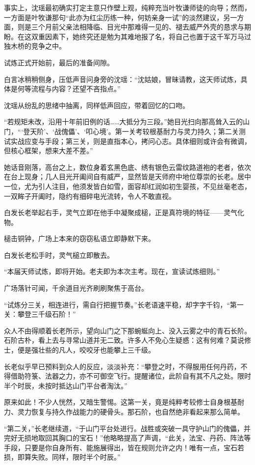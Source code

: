 事实上，沈瑶最初确实打定主意只作壁上观，纯粹充当叶牧谦师徒的向导；然而，一方面是叶牧谦那句“此亦为红尘历练一种，何妨亲身一试”的淡然建议，另一方面，则是三个月前父亲法相降临、目光中那难得一见的、褪去威严外壳的恳求与期盼。在这双重因素下，她终究还是勉为其难地报了名，将自己也置于这千军万马过独木桥的竞争之中。

\vspace{2em}

试炼正式开始前，最后的准备间隙。

白言冰稍稍侧身，压低声音问身旁的沈瑶：“沈姑娘，冒昧请教，这天师试炼，具体是何等流程与内容？还望不吝指点。”

沈瑶从纷乱的思绪中抽离，同样低声回应，带着回忆的口吻。

“若规矩未改，沿用十年前旧例的话……大抵分为三段。”她目光扫向那高耸入云的山门，“‘登天阶’、‘战傀儡’、‘叩心境’。第一关考较根基耐力与灵力持久；第二关测试实战应变与手段；第三关，则是直指本心，拷问心志。具体细则或许会有微调，但核心框架，想来大差不差。”

她话音刚落，高台之上，数位身着玄黑色底、绣有银色云雷纹路道袍的老者，依次在台上现身；几人目光开阖间自有威严，显然皆是天师府中地位尊崇的长老。居中一位，尤为引人注目，他须发皆白如雪，面容却红润如初生婴孩，不见丝毫老态，一双眸子开阖时，隐约有细碎电光流转，令人不敢直视。

白发长老举起右手，灵气立即在他手中凝聚成槌，正是真符境的特征——灵气化物。

槌击铜钟，广场上本来的窃窃私语立即静默下来。

白发长老松手时，灵气槌立即散去。

“本届天师试炼，即将开始。老夫即为本次主考。现在，宣读试炼细则。”

广场落针可闻，千余道目光齐刷刷聚焦于高台。

“试炼分三关，相连进行，需自行把握节奏。”长老语速平稳，却字字千钧，“第一关：攀登三千级石阶！”

众人不由得顺着长老所示，望向山门之下那蜿蜒向上、没入云雾之中的青石长阶。石阶古朴，看上去与寻常山道并无二致。许多人不免心生疑惑：这有何难？莫说修士，便是强壮些的凡人，咬咬牙也能攀上三千级。

长老似乎早已预料到众人的反应，淡淡补充：“攀登之时，不得服用任何丹药，不得借助符箓、法器之力，亦不可御空飞行。提醒诸位，此阶自有其不凡之处。限时半个时辰，未按时抵达山门平台者淘汰。”

原来如此！不少人恍然，又暗生警惕。这第一关，竟是纯粹考较修士自身根基耐力、灵力恢复与持久作战能力的硬骨头。那石阶，也自然绝非看起来那么简单。

“第二关，”长老继续道，“于山门平台处进行。战胜或突破一具守护山门的傀儡，并完好无损地取回其胸口的宝石！”他略略提高了声调，“此关，法宝、丹药、阵法等手段，只要是你自身所有、能施展得出，皆在规则允许之内！唯有一点，宝石若损，即算失败。同样，限时半个时辰。”

